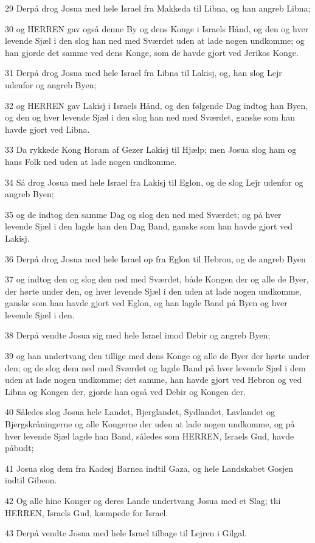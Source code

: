 \par 29 Derpå drog Josua med hele Israel fra Makkeda til Libna, og han angreb Libna;
\par 30 og HERREN gav også denne By og dens Konge i Israels Hånd, og den og hver levende Sjæl i den slog han ned med Sværdet uden at lade nogen undkomme; og han gjorde det samme ved dens Konge, som de havde gjort ved Jerikos Konge.
\par 31 Derpå drog Josua med hele Israel fra Libna til Lakisj, og, han slog Lejr udenfor og angreb Byen;
\par 32 og HERREN gav Lakisj i Israels Hånd, og den følgende Dag indtog han Byen, og den og hver levende Sjæl i den slog han ned med Sværdet, ganske som han havde gjort ved Libna.
\par 33 Da rykkede Kong Horam af Gezer Lakisj til Hjælp; men Josua slog ham og hans Folk ned uden at lade nogen undkomme.
\par 34 Så drog Josua med hele Israel fra Lakisj til Eglon, og de slog Lejr udenfor og angreb Byen;
\par 35 og de indtog den samme Dag og slog den ned med Sværdet; og på hver levende Sjæl i den lagde han den Dag Band, ganske som han havde gjort ved Lakisj.
\par 36 Derpå drog Josua med hele Israel op fra Eglon til Hebron, og de angreb Byen
\par 37 og indtog den og slog den ned med Sværdet, både Kongen der og alle de Byer, der hørte under den, og hver levende Sjæl i den uden at lade nogen undkomme, ganske som han havde gjort ved Eglon, og han lagde Band på Byen og hver levende Sjæl i den.
\par 38 Derpå vendte Josua sig med hele Israel imod Debir og angreb Byen;
\par 39 og han undertvang den tillige med dens Konge og alle de Byer der hørte under den; og de slog dem ned med Sværdet og lagde Band på hver levende Sjæl i dem uden at lade nogen undkomme; det samme, han havde gjort ved Hebron og ved Libna og Kongen der, gjorde han også ved Debir og Kongen der.
\par 40 Således slog Josua hele Landet, Bjerglandet, Sydlandet, Lavlandet og Bjergskråningerne og alle Kongerne der uden at lade nogen undkomme, og på hver levende Sjæl lagde han Band, således som HERREN, Israels Gud, havde påbudt;
\par 41 Josua slog dem fra Kadesj Barnea indtil Gaza, og hele Landskabet Gosjen indtil Gibeon.
\par 42 Og alle hine Konger og deres Lande undertvang Josua med et Slag; thi HERREN, Israels Gud, kæmpede for Israel.
\par 43 Derpå vendte Josua med hele Israel tilbage til Lejren i Gilgal.

